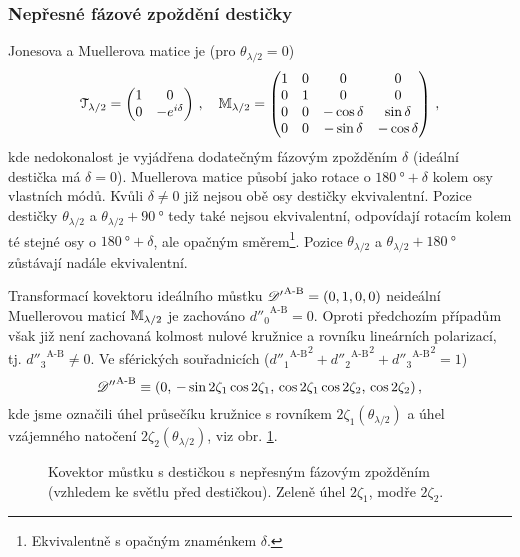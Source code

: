 \subsubsection*{Nepřesné fázové zpoždění destičky}
Jonesova a Muellerova matice je (pro $\theta_{\lambda/2}=0$)
\begin{equation}
    \mathcal{T}_{\lambda/2} = \begin{pmatrix} 1&0 \\ 0&-e^{i\delta} \end{pmatrix} \,, \quad
    \mathbb{M}_{\lambda/2} = \begin{pmatrix} 1&0&0&0 \\ 0&1&0&0 \\ 0&0&-\cos\delta&\sin\delta \\ 0&0&-\sin\delta&-\cos\delta \end{pmatrix} \,,
\end{equation}
kde nedokonalost je vyjádřena dodatečným fázovým zpožděním $\delta$ (ideální destička má $\delta=0$).
Muellerova matice působí jako rotace o $\SI{180}{\degree}+\delta$ kolem osy vlastních módů.
Kvůli $\delta\neq0$ již nejsou obě osy destičky ekvivalentní.
Pozice destičky $\theta_{\lambda/2}$ a $\theta_{\lambda/2}+\SI{90}{\degree}$ tedy také nejsou ekvivalentní, odpovídají rotacím kolem té stejné osy o $\SI{180}{\degree}+\delta$, ale opačným směrem\footnote{Ekvivalentně s opačným znaménkem $\delta$.}.
Pozice $\theta_{\lambda/2}$ a $\theta_{\lambda/2}+\SI{180}{\degree}$ zůstávají nadále ekvivalentní.

Transformací kovektoru ideálního můstku ${\mathscr{D}'}^\textrm{A-B}=(0, 1, 0, 0)$ neideální Muellerovou maticí $\mathbb{M}_{\lambda/2}$ je zachováno ${d''_0}^\textrm{A-B}=0$.
Oproti předchozím případům však již není zachovaná kolmost nulové kružnice a rovníku lineárních polarizací, tj. ${d''_3}^\textrm{A-B}\neq0$.
Ve sférických souřadnicích (${{d''_1}^\textrm{A-B}}^2+{{d''_2}^\textrm{A-B}}^2+{{d''_3}^\textrm{A-B}}^2=1$)
\begin{equation}
    {\mathscr{D}''}^\textrm{A-B} \equiv (0,\, -\sin2\zeta_1\cos2\zeta_1,\, \cos2\zeta_1\cos2\zeta_2,\, \cos2\zeta_2) \,,
\end{equation}
kde jsme označili úhel průsečíku kružnice s rovníkem $2\zeta_1(\theta_{\lambda/2})$ a úhel vzájemného natočení $2\zeta_2(\theta_{\lambda/2})$, viz obr. \ref{fig:mustek-nedokonale-desticka}.

\begin{figure}[htbp]
    \centering
    
    \caption{Kovektor můstku s destičkou s nepřesným fázovým zpožděním (vzhledem ke světlu před destičkou). Zeleně úhel $2\zeta_1$, modře $2\zeta_2$.}
    \label{fig:mustek-nedokonale-desticka}
\end{figure}

